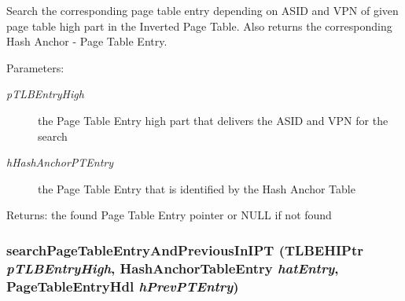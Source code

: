 Search the corresponding page table entry depending on ASID and VPN of given page table high part in the Inverted Page Table. Also returns the corresponding Hash Anchor - Page Table Entry. \begin{Desc}
\item[Parameters:]
\begin{description}
\item[{\em pTLBEntryHigh}]the Page Table Entry high part that delivers the ASID and VPN for the search \item[{\em hHashAnchorPTEntry}]the Page Table Entry that is identified by the Hash Anchor Table \end{description}
\end{Desc}
\begin{Desc}
\item[Returns:]the found Page Table Entry pointer or NULL if not found \end{Desc}
\hypertarget{group___v_m_m___i_p_t_g6a86fa230ac72f34daf47257381eb181}{
\subsubsection[{searchPageTableEntryAndPreviousInIPT}]{ searchPageTableEntryAndPreviousInIPT ({\bf TLBEHIPtr} {\em pTLBEntryHigh}, \/  {\bf HashAnchorTableEntry} {\em hatEntry}, \/  {\bf PageTableEntryHdl} {\em hPrevPTEntry})}}
\label{group___v_m_m___i_p_t_g6a86fa230ac72f34daf47257381eb181}


